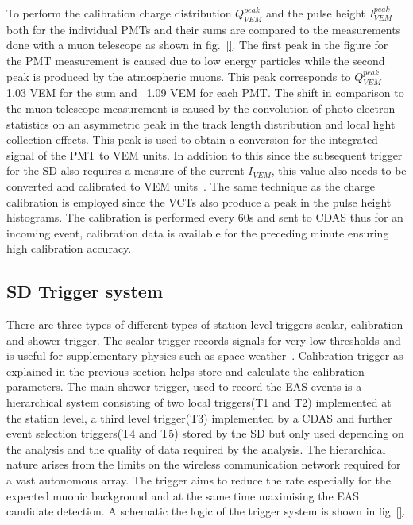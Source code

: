 To perform the calibration charge distribution $Q_{VEM}^{peak}$ and the pulse height $I_{VEM}^{peak}$ both for the individual PMTs and their sums are compared to the measurements done with a muon telescope as shown in fig.~\ref{}. The first peak in the figure for the PMT measurement is caused due to low energy particles while the second peak is produced by the atmospheric muons. This peak corresponds to $Q_{VEM}^{peak}$~ 1.03 VEM for the sum and ~1.09 VEM for each PMT. The shift in comparison to the muon telescope measurement is caused by the convolution of photo-electron statistics on an asymmetric peak in the track length distribution and local light
collection effects. This peak is used to obtain a conversion for the integrated signal of the PMT to VEM units. In addition to this since the subsequent trigger for the SD also requires a measure of the current $I_{VEM}$, this value also needs to be converted and calibrated to VEM units~\cite{}. The same technique as the charge calibration is employed since the VCTs also produce a peak in the pulse height histograms. The calibration is performed every 60s and sent to CDAS thus for an incoming event, calibration data is available for the preceding minute ensuring high calibration accuracy. 

\subsection{SD Trigger system}
\label{sec:Sur_det_trig}
There are three types of different types of station level triggers scalar, calibration and shower trigger. The scalar trigger records signals for very low thresholds and is useful for supplementary physics such as space weather~\cite{}. Calibration trigger as explained in the previous section helps store and calculate the calibration parameters. The main shower trigger, used to record the EAS events is a hierarchical system consisting of two local triggers(T1 and T2) implemented at the station level, a third level trigger(T3) implemented by a CDAS and further event selection triggers(T4 and T5) stored by the SD but only used depending on the analysis and the quality of data required by the analysis. The hierarchical nature arises from the limits on the wireless communication network required for a vast autonomous array. The trigger aims to reduce the rate especially for the expected muonic background and at the same time maximising the EAS candidate detection. A schematic the logic of the trigger system is shown in fig~\ref{}. 

